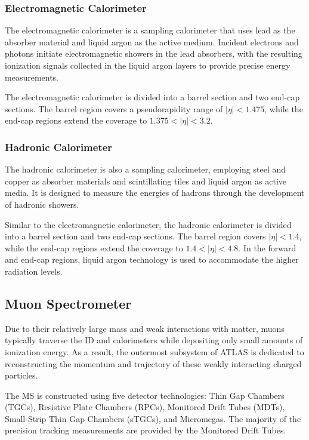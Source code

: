 \subsubsection{Electromagnetic Calorimeter}

The electromagnetic calorimeter is a sampling calorimeter that uses lead as the absorber material and liquid argon as the active medium. 
Incident electrons and photons initiate electromagnetic showers in the lead absorbers, with the resulting ionization signals collected in the liquid argon layers to provide precise energy measurements.

The electromagnetic calorimeter is divided into a barrel section and two end-cap sections. 
The barrel region covers a pseudorapidity range of $|\eta| < 1.475$, while the end-cap regions extend the coverage to $1.375 < |\eta| < 3.2$.

\subsubsection{Hadronic Calorimeter}

The hadronic calorimeter is also a sampling calorimeter, employing steel and copper as absorber materials and scintillating tiles and liquid argon as active media. 
It is designed to measure the energies of hadrons through the development of hadronic showers.

Similar to the electromagnetic calorimeter, the hadronic calorimeter is divided into a barrel section and two end-cap sections. 
The barrel region covers $|\eta| < 1.4$, while the end-cap regions extend the coverage to $1.4 < |\eta| < 4.8$. 
In the forward and end-cap regions, liquid argon technology is used to accommodate the higher radiation levels. 

\subsection{Muon Spectrometer}

Due to their relatively large mass and weak interactions with matter, muons typically traverse the ID and calorimeters while depositing only small amounts of ionization energy. 
As a result, the outermost subsystem of ATLAS is dedicated to reconstructing the momentum and trajectory of these weakly interacting charged particles.

The MS is constructed using five detector technologies: Thin Gap Chambers (TGCs), Resistive Plate Chambers (RPCs), Monitored Drift Tubes (MDTs), Small-Strip Thin Gap Chambers (sTGCs), and Micromegas. 
The majority of the precision tracking measurements are provided by the Monitored Drift Tubes.

